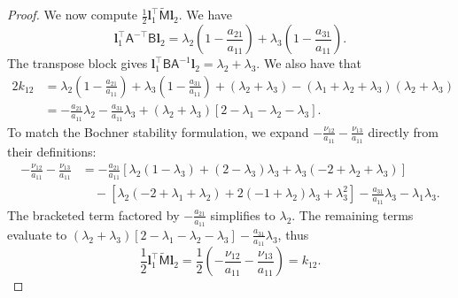 \documentclass[10pt,a4paper]{amsart}
\newcommand{\bfl}{\boldsymbol{l}}
\newcommand{\msfA}{\mathsf{A}}
\newcommand{\msfB}{\mathsf{B}}
\newcommand{\msfM}{\mathsf{M}}
\begin{document}
\begin{proof}
  We now compute $\frac{1}{2} \bfl_1^\top \tilde{\msfM} \bfl_2$. We have 
  \[
    \bfl_1^\top \msfA^{-\top} \msfB \bfl_2 = \lambda_2\left(1 - \frac{a_{21}}{a_{11}} \right) + \lambda_3\left(1 - \frac{a_{31}}{a_{11}} \right).
  \]
  The transpose block gives $\bfl_1^\top \msfB \msfA^{-1} \bfl_2 = \lambda_2 + \lambda_3$. We also have that
  \begin{align*}
    2 k_{12} &= \lambda_2\left(1 - \frac{a_{21}}{a_{11}}\right) + \lambda_3\left(1 - \frac{a_{31}}{a_{11}}\right) + (\lambda_2 + \lambda_3) - (\lambda_1+\lambda_2+\lambda_3)(\lambda_2+\lambda_3) \\
    &= -\frac{a_{21}}{a_{11}}\lambda_2 - \frac{a_{31}}{a_{11}}\lambda_3 + (\lambda_2+\lambda_3)\left[ 2 - \lambda_1 - \lambda_2 - \lambda_3 \right].
  \end{align*}
  To match the Bochner stability formulation, we expand $-\frac{\nu_{12}}{a_{11}} - \frac{\nu_{13}}{a_{11}}$ directly from their definitions:
  \begin{align*}
    -\frac{\nu_{12}}{a_{11}} - \frac{\nu_{13}}{a_{11}} &= -\frac{a_{21}}{a_{11}} \left[ \lambda_2(1-\lambda_3) + (2-\lambda_3)\lambda_3 + \lambda_3(-2+\lambda_2+\lambda_3) \right] \\
    &\quad - \left[ \lambda_2(-2+\lambda_1+\lambda_2) + 2(-1+\lambda_2)\lambda_3 + \lambda_3^2 \right] - \frac{a_{31}}{a_{11}}\lambda_3 - \lambda_1\lambda_3.
  \end{align*}
  The bracketed term factored by $-\frac{a_{21}}{a_{11}}$ simplifies to $\lambda_2$. The remaining terms evaluate to $(\lambda_2+\lambda_3)[2 - \lambda_1 - \lambda_2 - \lambda_3] - \frac{a_{31}}{a_{11}}\lambda_3$, thus 
  \[
    \frac{1}{2} \bfl_1^\top \tilde{\msfM} \bfl_2 = \frac{1}{2} \left( -\frac{\nu_{12}}{a_{11}} - \frac{\nu_{13}}{a_{11}} \right) = k_{12}.
  \]


\end{proof}
\end{document}
